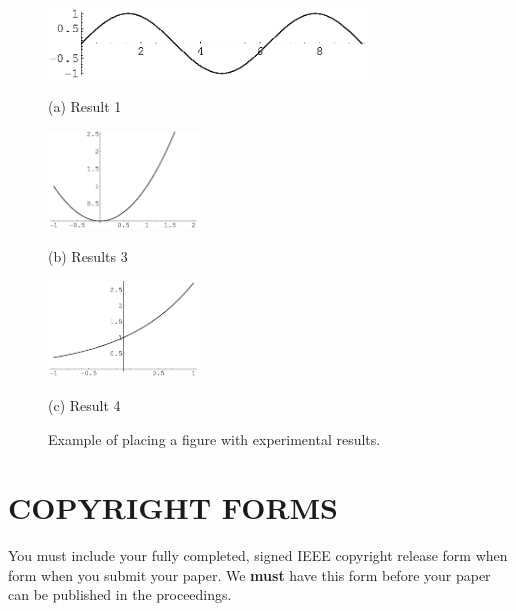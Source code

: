 \documentclass{article}
\begin{document}
\begin{figure}[t]

\begin{minipage}[b]{1.0\linewidth}
  \centering
  \centerline{\includegraphics[width=8.5cm]{Figures/image1}}
  \centerline{(a) Result 1}\medskip
\end{minipage}
%
\begin{minipage}[b]{.48\linewidth}
  \centering
  \centerline{\includegraphics[width=4.0cm]{Figures/image3}}
  \centerline{(b) Results 3}\medskip
\end{minipage}
\hfill
\begin{minipage}[b]{0.48\linewidth}
  \centering
  \centerline{\includegraphics[width=4.0cm]{Figures/image4}}
  \centerline{(c) Result 4}\medskip
\end{minipage}
%
\caption{Example of placing a figure with experimental results.}
\label{fig:res}
%
\end{figure}



\section{COPYRIGHT FORMS}
\label{sec:copyright}

You must include your fully completed, signed IEEE copyright release form when
form when you submit your paper. We {\bf must} have this form before your paper
can be published in the proceedings.




\end{document}
